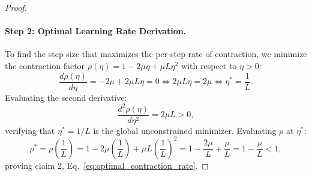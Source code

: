 \begin{proof}
\paragraph{Step 2: Optimal Learning Rate Derivation.}
To find the step size that maximizes the per-step rate of contraction, we minimize the contraction factor $\rho(\eta) = 1 - 2\mu \eta + \mu L \eta^2$ with respect to $\eta > 0$:
\begin{equation}
\frac{d \rho(\eta)}{d \eta} = -2\mu + 2\mu L \eta = 0 \iff 2\mu L \eta = 2\mu \iff \eta^* = \frac{1}{L}.
\end{equation}
Evaluating the second derivative:
\begin{equation}
\frac{d^2 \rho(\eta)}{d \eta^2} = 2\mu L > 0,
\end{equation}
verifying that $\eta^* = 1/L$ is the global unconstrained minimizer.
Evaluating $\rho$ at $\eta^*$:
\begin{equation}
\rho^* = \rho\left(\frac{1}{L}\right) = 1 - 2\mu \left(\frac{1}{L}\right) + \mu L \left(\frac{1}{L}\right)^2 = 1 - \frac{2\mu}{L} + \frac{\mu}{L} = 1 - \frac{\mu}{L} < 1,
\end{equation}
proving claim 2, Eq.~\eqref{eq:optimal_contraction_rate}.


\end{proof}
